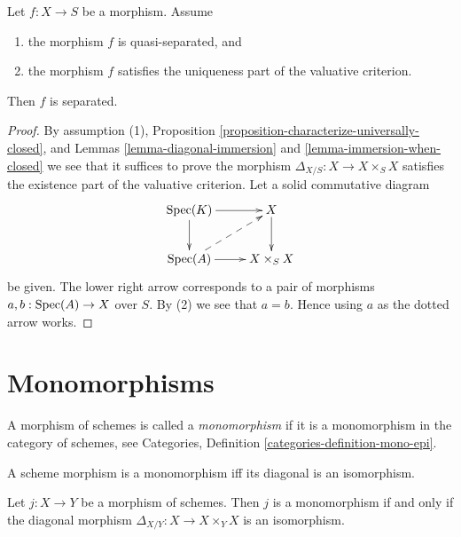 \begin{lemma}
\label{lemma-valuative-criterion-separatedness}
\begin{reference}
\cite[II Proposition 7.2.3]{EGA}
\end{reference}
Let $f : X \to S$ be a morphism.
Assume
\begin{enumerate}
\item the morphism $f$ is quasi-separated, and
\item the morphism $f$ satisfies the uniqueness
part of the valuative criterion.
\end{enumerate}
Then $f$ is separated.
\end{lemma}

\begin{proof}
By assumption (1),
Proposition \ref{proposition-characterize-universally-closed}, and
Lemmas \ref{lemma-diagonal-immersion} and \ref{lemma-immersion-when-closed}
we see that it suffices to prove the morphism
$\Delta_{X/S} : X \to X \times_S X$ satisfies the existence
part of the valuative criterion.
Let a solid commutative diagram
$$
\xymatrix{
\Spec(K) \ar[r] \ar[d] & X \ar[d] \\
\Spec(A) \ar[r] \ar@{-->}[ru] & X \times_S X
}
$$
be given. The lower right arrow corresponds to a
pair of morphisms $a, b : \mathop{\mathrm{Spec}}(A) \to X$ over $S$.
By (2) we see that $a = b$. Hence using $a$ as the dotted
arrow works.
\end{proof}





\section{Monomorphisms}
\label{section-monomorphisms}

\begin{definition}
\label{definition-monomorphism}
A morphism of schemes is called a {\it monomorphism} if it is
a monomorphism in the category of schemes, see
Categories, Definition \ref{categories-definition-mono-epi}.
\end{definition}

\begin{lemma}
\label{lemma-monomorphism}
\begin{slogan}
A scheme morphism is a monomorphism iff its diagonal is an isomorphism.
\end{slogan}
Let $j : X \to Y$ be a morphism of schemes.
Then $j$ is a monomorphism if and only if the
diagonal morphism $\Delta_{X/Y} : X \to X \times_Y X$ is
an isomorphism.
\end{lemma}

